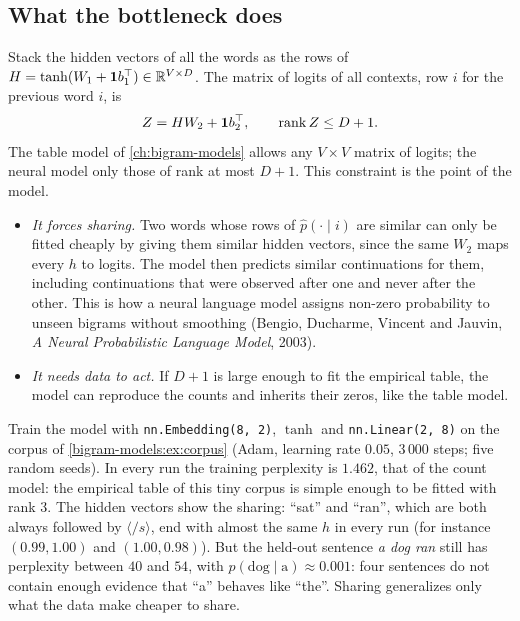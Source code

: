 \begin{notechapter}
\section{What the bottleneck does}\label{bigram-neural:sec:bottleneck}

Stack the hidden vectors of all the words as the rows of $H = \tanh(W_1 + \mathbf 1b_1^\top)\in\mathbb{R}^{V\times D}$. The matrix of logits of all
contexts, row $i$ for the previous word $i$, is
\[
  Z = HW_2 + \mathbf 1b_2^\top,\qquad\operatorname{rank} Z\leq D + 1 .
\]
The table model of \cref{ch:bigram-models} allows any $V\times V$ matrix of logits; the neural model only those
of rank at most $D + 1$. This constraint is the point of the model.
\begin{itemize}
  \item \emph{It forces sharing.} Two words whose rows of $\hat p(\cdot\mid i)$ are similar can only be fitted
        cheaply by giving them similar hidden vectors, since the same $W_2$ maps every $h$ to logits.
        The model then predicts similar continuations for them, including continuations
        that were observed after one and never after the other. This is how a neural
        language model assigns non-zero probability to unseen bigrams without smoothing
        (Bengio, Ducharme, Vincent and Jauvin, \emph{A Neural Probabilistic Language Model},
        2003).
  \item \emph{It needs data to act.} If $D + 1$ is large enough to fit the empirical table, the model
        can reproduce the counts and inherits their zeros, like the table model.
\end{itemize}

\begin{example}[The four-sentence corpus with $D = 2$]\label{bigram-neural:ex:corpus}
Train the model with \texttt{nn.Embedding(8, 2)}, $\tanh$ and \texttt{nn.Linear(2, 8)} on the corpus of
\cref{bigram-models:ex:corpus} (Adam, learning rate $0.05$, $3\,000$ steps; five random seeds). In every run the
training perplexity is $1.462$, that of the count model: the empirical table of this tiny corpus
is simple enough to be fitted with rank $3$. The hidden vectors show the sharing: ``sat'' and
``ran'', which are both always followed by $\langle/s\rangle$, end with almost the same $h$ in every run (for
instance $(0.99, 1.00)$ and $(1.00, 0.98)$). But the held-out sentence \emph{a dog ran} still has
perplexity between $40$ and $54$, with $p(\text{dog}\mid\text{a})\approx0.001$: four sentences do not contain enough evidence
that ``a'' behaves like ``the''. Sharing generalizes only what the data make cheaper to share.
\end{example}


\end{notechapter}
